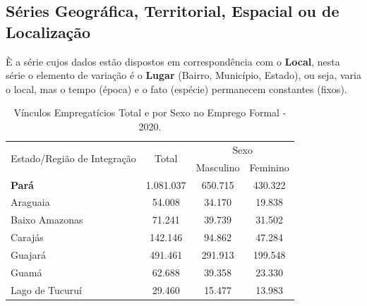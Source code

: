 \newpage

\subsection{Séries Geográfica, Territorial, Espacial ou de Localização}

\inic È a série cujos dados estão dispostos em correspondência com o \textbf{Local}, nesta série o elemento de variação é o \textbf{Lugar} (Bairro, Município, Estado), ou seja, varia o local, mas o tempo (época) e o fato (espécie) permanecem constantes (fixos).




\begin{table}[!htb]
\centering
    {
    \caption{Vínculos Empregatícios Total e por Sexo no Emprego Formal - 2020.}
    \label{obitos2}
    \vspace{0.1cm}
\begin{tabular}{l|c|c|c}
\hline\hline
\multirow{2}{*}{Estado/Região de Integração} & \multicolumn{1}{c|}{\multirow{2}{*}{Total}} & \multicolumn{2}{c}{Sexo}                                     \\ \cline{3-4} 
                           & \multicolumn{1}{c|}{}                       & \multicolumn{1}{c|}{Masculino} & \multicolumn{1}{c}{Feminino} \\ \cline{1-2}
\hline
\textbf{Pará}              &  1.081.037                                 &  650.715                      &   430.322                    \\
Araguaia                   &  54.008                                    &  34.170                       &   19.838                     \\
Baixo Amazonas             &  71.241                                    &  39.739                       &   31.502                     \\
Carajás                    &  142.146                                   &  94.862                       &   47.284                     \\
Guajará                    &  491.461                                   &  291.913                      &   199.548                     \\
Guamá                      &  62.688                                    &  39.358                       &   23.330                      \\
Lago de Tucuruí            &  29.460                                    &  15.477                       &   13.983                       \\

\end{tabular}}
\end{table}
